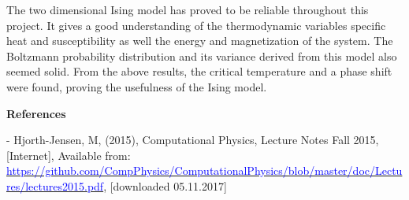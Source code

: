 \documentclass[10pt,a4paper]{article}
\begin{document}
\noindent The two dimensional Ising model has proved to be reliable throughout this project. It gives a good understanding of the thermodynamic variables specific heat and susceptibility as well the energy and magnetization of the system. The Boltzmann probability distribution and its variance derived from this model also seemed solid. From the above results, the critical temperature and a phase shift were found, proving the usefulness of the Ising model.

\newpage

\begin{center}
{\LARGE\bf References}
\end{center}

\noindent - Hjorth-Jensen, M, (2015), Computational Physics, Lecture Notes Fall 2015, [Internet], Available from: \href{https://github.com/CompPhysics/ComputationalPhysics/blob/master/doc/Lectures/lectures2015.pdf}{\textcolor{blue}{https://github.com/CompPhysics/ComputationalPhysics/blob/master/doc/Lectures/lectures2015.pdf}}, [downloaded 05.11.2017]
\end{document}
